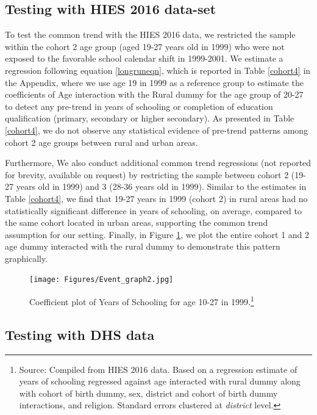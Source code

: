 \documentclass[12pt,letterpaper]{article}
\newcommand{\0}{\ensuremath{\mbox{\boldmath $0$}}}
\begin{document}
\subsection{Testing with HIES 2016 data-set\label{subsec.cohort_trend_HIES}}
To test the common trend with the HIES 2016 data, we restricted the sample within the cohort 2 age group (aged 19-27 years old in 1999) who were not exposed to the favorable school calendar shift in 1999-2001. We estimate a regression following equation \ref{longruneqn}, which is reported in Table \ref{cohort4} in the Appendix, where we use age 19 in 1999 as a reference group to estimate the coefficients of Age interaction with the Rural dummy for the age group of 20-27 to detect any pre-trend in years of schooling or completion of education qualification (primary, secondary or higher secondary). As presented in Table \ref{cohort4}, we do not observe any statistical evidence of pre-trend patterns among cohort 2 age groups between rural and urban areas. 
   
Furthermore, We also conduct additional common trend regressions (not reported for brevity, available on request) by restricting the sample between cohort 2 (19-27 years old in 1999) and 3 (28-36 years old in 1999). Similar to the estimates in Table \ref{cohort4}, we find that 19-27 years in 1999 (cohort 2) in rural areas had no statistically significant difference in years of schooling, on average, compared to the same cohort located in urban areas, supporting the common trend assumption for our setting. Finally, in Figure \ref{event_graph}, we plot the entire cohort 1 and 2 age dummy interacted with the rural dummy to demonstrate this pattern graphically.  

\begin{figure}[h!]
\centering
\texttt{[image: Figures/Event\_graph2.jpg]}\\
\caption{Coefficient plot of Years of Schooling for age 10-27 in 1999.\footnote{Source: Compiled from HIES 2016 data. Based on a regression estimate of years of schooling regressed against age interacted with rural dummy along with cohort of birth dummy, sex, district and cohort of birth dummy interactions, and religion. Standard errors clustered at \textit{district} level.}}
\label{event_graph}
\end{figure}


\subsection{Testing with DHS data\label{subsec.cohort_trend_DHS}}
\end{document}
